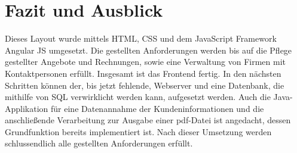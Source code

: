 \chapter{Fazit und Ausblick}
\label{cha:Fazit}

Dieses Layout wurde mittels HTML, CSS und dem JavaScript Framework Angular JS umgesetzt. 
Die gestellten Anforderungen werden bis auf die Pflege gestellter Angebote und Rechnungen, sowie eine Verwaltung von Firmen mit Kontaktpersonen erfüllt. Insgesamt ist das Frontend fertig.
In den nächsten Schritten können der, bis jetzt fehlende, Webserver und eine Datenbank, die mithilfe von SQL verwirklicht werden kann, aufgesetzt werden. Auch die Java-Applikation für eine Datenannahme der Kundeninformationen und die anschließende Verarbeitung zur Ausgabe einer pdf-Datei ist angedacht, dessen Grundfunktion bereits implementiert ist. Nach dieser Umsetzung werden schlussendlich alle gestellten Anforderungen erfüllt.